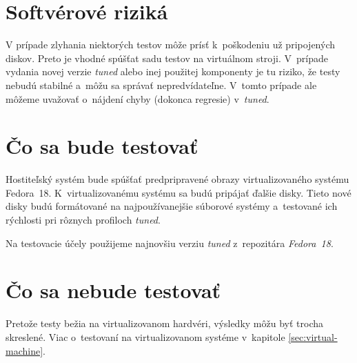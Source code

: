 \section{Softvérové riziká}
\label{sec:softverove-rizika}

V prípade zlyhania niektorých testov môže prísť k~poškodeniu už pripojených
diskov. Preto je vhodné spúšťat sadu testov na virtuálnom stroji. V~prípade
vydania novej verzie \emph{tuned} alebo inej použitej komponenty je tu riziko,
že testy nebudú stabilné a~môžu sa správať nepredvídateľne. V~tomto prípade ale
môžeme uvažovať o~nájdení chyby (dokonca regresie) v~\emph{tuned}.

\section{Čo sa bude testovať}

Hostiteľský systém bude spúšťať predpripravené obrazy virtualizovaného systému
Fedora~18. K~virtualizovanému systému sa budú pripájať ďalšie disky. Tieto nové
disky budú formátované na najpoužívanejšie súborové systémy a~testované ich
rýchlosti pri rôznych profiloch \emph{tuned}.

Na testovacie účely použijeme najnovšiu verziu \emph{tuned} z~repozitára
\emph{Fedora~18}.

\section{Čo sa nebude testovať}

Pretože testy bežia na virtualizovanom hardvéri, výsledky môžu byť trocha
skreslené. Viac o~testovaní na virtualizovanom systéme v~kapitole
\ref{sec:virtual-machine}.


